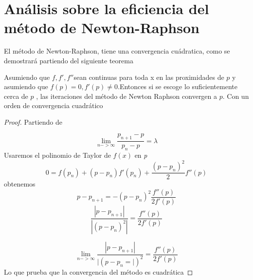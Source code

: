 \section{Análisis sobre la eficiencia del método de Newton-Raphson}

El método de Newton-Raphson, tiene una convergencia cuádratica, como se demostrará partiendo del siguiente teorema

\begin{theorem}
Asumiendo que $f,f',f''  $sean continuas para toda x en las proximidades de $p$ y asumiendo que $f(p) = 0, f'(p) \neq 0 $.Entonces si se escoge lo suficientemente cerca de $p$ , las iteraciones del método de Newton Raphson convergen a $p$. Con un orden de convergencia cuadrático
\end{theorem}

\begin{proof}
Partiendo de 

\begin{displaymath}
\lim_{n->\infty}{\frac{p_{n+1} - p}{p_n - p}} = \lambda
\end{displaymath}
Usaremos el polinomio de Taylor de $f(x)$ en \textit{p}
\begin{displaymath}
 0 = f(p_n) + (p-p_n)f'(p_n) + \frac{(p-p_n)^2}{2}f''(p)
\end{displaymath}
obtenemos
\begin{displaymath}
p - p_{n+1} =  - (p-p_n)^2 \frac{f''(p)}{2f'(p)}
\end{displaymath}
\begin{displaymath}
\frac{|p - p_{n+1}|}{|(p-p_n)^2|} = \frac{f''(p)}{2f'(p)}
\end{displaymath}

\begin{displaymath}
\lim_{n->\infty}{\frac{|p - p_{n+1}|}{|(p-p_n=|)^2}} =  \frac{f''(p)}{2f'(p)}
\end{displaymath}
Lo que prueba que la convergencia del método es cuadrática
\end{proof}


